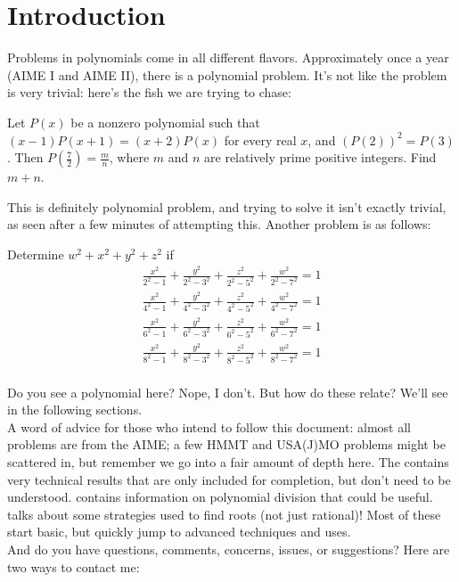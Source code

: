 \documentclass[11pt,titlepage]{scrartcl}
\begin{document}
\section{Introduction}
Problems in polynomials come in all different flavors. Approximately once a year (AIME I and AIME II), there is a polynomial problem. It's not like the problem is very trivial: here's the fish we are trying to chase:
\begin{Problem}
Let $P(x)$ be a nonzero polynomial such that $(x-1)P(x+1)=(x+2)P(x)$ for every real $x$, and $\left(P(2)\right)^2 = P(3)$. Then $P(\tfrac72)=\tfrac{m}{n}$, where $m$ and $n$ are relatively prime positive integers. Find $m + n$.
\end{Problem}
This is definitely polynomial problem, and trying to solve it isn't exactly trivial, as seen after a few minutes of attempting this.  Another problem is as follows:
\begin{Problem}
Determine $w^2+x^2+y^2+z^2$ if
\[ \begin{array}{l} \displaystyle \frac{x^2}{2^2-1}+\frac{y^2}{2^2-3^2}+\frac{z^2}{2^2-5^2}+\frac{w^2}{2^2-7^2}=1 \\ \displaystyle \frac{x^2}{4^2-1}+\frac{y^2}{4^2-3^2}+\frac{z^2}{4^2-5^2}+\frac{w^2}{4^2-7^2}=1 \\ \displaystyle \frac{x^2}{6^2-1}+\frac{y^2}{6^2-3^2}+\frac{z^2}{6^2-5^2}+\frac{w^2}{6^2-7^2}=1 \\ \displaystyle \frac{x^2}{8^2-1}+\frac{y^2}{8^2-3^2}+\frac{z^2}{8^2-5^2}+\frac{w^2}{8^2-7^2}=1 \\ \end{array}  \]
\end{Problem}
Do you see a polynomial here? Nope, I don't. But how do these relate? We'll see in the following sections.\\[2\baselineskip]
A word of advice for those who intend to follow this document: almost all problems are from the AIME; a few HMMT and USA(J)MO problems might be scattered in, but remember we go into a fair amount of depth here. The  contains very technical results that are only included for completion, but don't need to be understood.  contains information on polynomial division that could be useful.  talks about some strategies used to find roots (not just rational)! Most of these start basic, but quickly jump to advanced techniques and uses.\\[2\baselineskip]
And do you have questions, comments, concerns, issues, or suggestions? Here are two ways to contact me:
\end{document}
